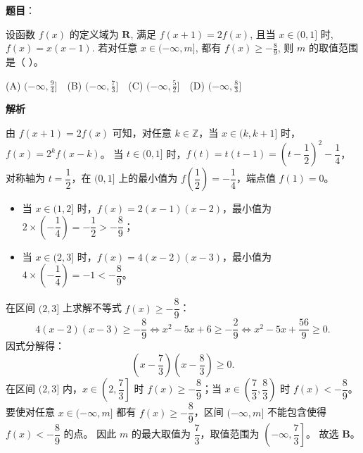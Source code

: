 \begin{answer}

\textbf{题目}：

设函数 $f(x)$ 的定义域为 $\mathbf{R}$, 满足 $f(x+1) = 2f(x)$, 且当 $x \in (0, 1]$ 时, $f(x) = x(x-1)$. 若对任意 $x \in (-\infty, m]$, 都有 $f(x) \geqslant -\frac{8}{9}$, 则 $m$ 的取值范围是（ ）。

(A) $(-\infty, \frac{9}{4}]$　(B) $(-\infty, \frac{7}{3}]$　(C) $(-\infty, \frac{5}{2}]$　(D) $(-\infty, \frac{8}{3}]$

\textbf{解析}

由 $f(x+1) = 2f(x)$ 可知，对任意 $k \in \mathbb{Z}$，当 $x \in (k, k+1]$ 时，$f(x) = 2^k f(x-k)$。
当 $t \in (0, 1]$ 时，$f(t) = t(t-1) = \left(t - \dfrac{1}{2}\right)^2 - \dfrac{1}{4}$，对称轴为 $t = \dfrac{1}{2}$，在 $(0, 1]$ 上的最小值为 $f\left(\dfrac{1}{2}\right) = -\dfrac{1}{4}$，端点值 $f(1) = 0$。
\begin{itemize}
\item 当 $x \in (1, 2]$ 时，$f(x) = 2(x-1)(x-2)$，最小值为 $2 \times \left(-\dfrac{1}{4}\right) = -\dfrac{1}{2} > -\dfrac{8}{9}$；
\item 当 $x \in (2, 3]$ 时，$f(x) = 4(x-2)(x-3)$，最小值为 $4 \times \left(-\dfrac{1}{4}\right) = -1 < -\dfrac{8}{9}$。
\end{itemize}
在区间 $(2, 3]$ 上求解不等式 $f(x) \geqslant -\dfrac{8}{9}$：
\nopagebreak[4]
\[4(x-2)(x-3) \geqslant -\frac{8}{9} \iff x^2 - 5x + 6 \geqslant -\frac{2}{9} \iff x^2 - 5x + \frac{56}{9} \geqslant 0.\]
因式分解得：
\nopagebreak[4]
\[\left(x - \frac{7}{3}\right)\left(x - \frac{8}{3}\right) \geqslant 0.\]
在区间 $(2, 3]$ 内，$x \in \left(2, \dfrac{7}{3}\right]$ 时 $f(x) \geqslant -\dfrac{8}{9}$；当 $x \in \left(\dfrac{7}{3}, \dfrac{8}{3}\right)$ 时 $f(x) < -\dfrac{8}{9}$。
要使对任意 $x \in (-\infty, m]$ 都有 $f(x) \geqslant -\dfrac{8}{9}$，区间 $(-\infty, m]$ 不能包含使得 $f(x) < -\dfrac{8}{9}$ 的点。
因此 $m$ 的最大取值为 $\dfrac{7}{3}$，取值范围为 $\left(-\infty, \dfrac{7}{3}\right]$。
故选 \textbf{B}。


\par\medskip

\end{answer}

